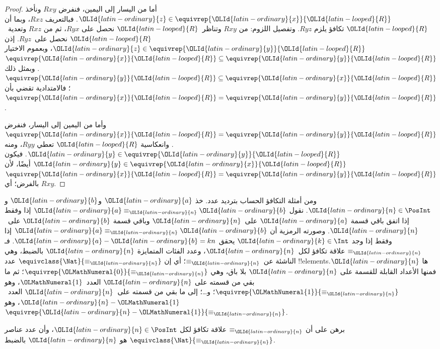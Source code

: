 \documentclass[../../../include/open-logic-section]{subfiles}
\begin{document}
\begin{proof}
أما من اليسار إلى اليمين، فنفرض $Rxy$ ونأخذ $\OLId{latin-ordinary}{z} \in
\equivrep{\OLId{latin-ordinary}{x}}{\OLId{latin-looped}{R}}$. فبالتعريف $Rxz$، وبما أن $\OLId{latin-looped}{R}$ تكافؤ يلزم $Ryz$.
وتفصيل اللزوم: من $Rxy$ وتناظر~$\OLId{latin-looped}{R}$ نحصل على $Ryx$، ثم من
$Rxz$ وتعدية~$\OLId{latin-looped}{R}$ نحصل على~$Ryz$. إذن $\OLId{latin-ordinary}{z} \in \equivrep{\OLId{latin-ordinary}{y}}{\OLId{latin-looped}{R}}$،
وبعموم الاختيار $\equivrep{\OLId{latin-ordinary}{x}}{\OLId{latin-looped}{R}} \subseteq \equivrep{\OLId{latin-ordinary}{y}}{\OLId{latin-looped}{R}}$.
وبمثل ذلك $\equivrep{\OLId{latin-ordinary}{y}}{\OLId{latin-looped}{R}} \subseteq \equivrep{\OLId{latin-ordinary}{x}}{\OLId{latin-looped}{R}}$؛ فالامتدادية
تقضي بأن $\equivrep{\OLId{latin-ordinary}{x}}{\OLId{latin-looped}{R}} = \equivrep{\OLId{latin-ordinary}{y}}{\OLId{latin-looped}{R}}$.

وأما من اليمين إلى اليسار، فنفرض $\equivrep{\OLId{latin-ordinary}{x}}{\OLId{latin-looped}{R}} =
\equivrep{\OLId{latin-ordinary}{y}}{\OLId{latin-looped}{R}}$. وانعكاسية $\OLId{latin-looped}{R}$ تعطي $Ryy$، ومنه
$\OLId{latin-ordinary}{y} \in \equivrep{\OLId{latin-ordinary}{y}}{\OLId{latin-looped}{R}}$. فيكون $\OLId{latin-ordinary}{y} \in \equivrep{\OLId{latin-ordinary}{x}}{\OLId{latin-looped}{R}}$ أيضًا،
لأن $\equivrep{\OLId{latin-ordinary}{x}}{\OLId{latin-looped}{R}} = \equivrep{\OLId{latin-ordinary}{y}}{\OLId{latin-looped}{R}}$ بالفرض؛ أي $Rxy$.
\end{proof}

\begin{ex}
ومن أمثلة التكافؤ الحساب بترديد عدد. خذ $\OLId{latin-ordinary}{a}$ و$\OLId{latin-ordinary}{b}$ و$\OLId{latin-ordinary}{n} \in \PosInt$.
نقول $\OLId{latin-ordinary}{a} \equiv_\OLId{latin-ordinary}{n} \OLId{latin-ordinary}{b}$ إذا وفقط إذا اتفق باقي قسمة $\OLId{latin-ordinary}{a}$ على~$\OLId{latin-ordinary}{n}$
وباقي قسمة $\OLId{latin-ordinary}{b}$ على~$\OLId{latin-ordinary}{n}$. وصورته الرمزية أن $\OLId{latin-ordinary}{a} \equiv_\OLId{latin-ordinary}{n} \OLId{latin-ordinary}{b}$ إذا وفقط
إذا وجد $\OLId{latin-ordinary}{k} \in \Int$ يحقق $\OLId{latin-ordinary}{a} - \OLId{latin-ordinary}{b} = kn$. فـ$\equiv_\OLId{latin-ordinary}{n}$ علاقة تكافؤ
لكل~$\OLId{latin-ordinary}{n}$، وعدد الفئات المتمايزة $\OLId{latin-ordinary}{n}$ بالضبط، وهي الناشئة عن~$\equiv_\OLId{latin-ordinary}{n}$؛ أي إن
$\equivclass{\Nat}{\equiv_\OLId{latin-ordinary}{n}}$ عدد !!{element}sها $\OLId{latin-ordinary}{n}$.
فمنها الأعداد القابلة للقسمة على $\OLId{latin-ordinary}{n}$ بلا باق، وهي
$\equivrep{\OLMathNumeral{0}}{\equiv_\OLId{latin-ordinary}{n}}$؛ ثم ما بقي من قسمته على $\OLId{latin-ordinary}{n}$ العدد~$\OLMathNumeral{1}$،
وهو $\equivrep{\OLMathNumeral{1}}{\equiv_\OLId{latin-ordinary}{n}}$؛ و\ldots؛ إلى ما بقي من قسمته على~$\OLId{latin-ordinary}{n}$
العدد~$\OLId{latin-ordinary}{n}-\OLMathNumeral{1}$، وهو~$\equivrep{\OLId{latin-ordinary}{n}-\OLMathNumeral{1}}{\equiv_\OLId{latin-ordinary}{n}}$.
\end{ex}

\begin{prob}
برهن على أن $\equiv_\OLId{latin-ordinary}{n}$ علاقة تكافؤ لكل $\OLId{latin-ordinary}{n} \in \PosInt$، وأن
عدد عناصر $\equivclass{\Nat}{\equiv_\OLId{latin-ordinary}{n}}$ هو $\OLId{latin-ordinary}{n}$ بالضبط.
\end{prob}
\end{document}
